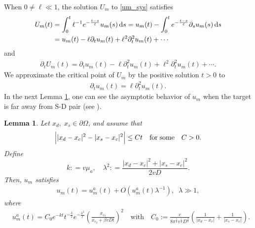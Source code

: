 \documentclass[10pt]{article}
\newtheorem{lemma}[theorem]{Lemma}
\numberwithin{equation}{section}
\numberwithin{figure}{section}
\begin{document}
When $ 0 \neq \ell \ll 1$, the solution $U_m$ to \eqref{um_sys} satisfies 
\begin{equation*}
\begin{split}
U_m(t) &= \int_0^t \ell^{-1}e^{-\frac{t-s}{\ell}} u_m (s)  \,{\rm d}s  = u_m(t) - \int_0^t  e^{-\frac{t-s}{\ell}} \partial_s u_m (s)  \,{\rm d}s  \\
&= u_m(t) - \ell \partial_t u_m (t) + \ell^2 \partial^2_t u_m (t) + \cdots
\end{split}
\end{equation*}
and
\begin{equation*}
\begin{split}
\partial_t U_m(t) = \partial_t u_m(t) - \ell \partial^2_t u_m (t) + \ell^2 \partial^2_t u_m (t) + \cdots.
\end{split}
\end{equation*}
We approximate the critical point of $U_m$ by the positive solution $t>0$ to
\begin{equation}\label{ellsmalleq}
\begin{split}
\partial_t u_m(t) = \ell \partial^2_t u_m (t).
\end{split}
\end{equation}
In the next Lemma \ref{solbehaviortheorem1}, one can see the asymptotic behavior of ${u}_m$ when the target is far away from S-D pair (see \cite[Theorem 2.2 and Remark 2.3]{Chen2023}).
\begin{lemma}\label{solbehaviortheorem1}
Let $x_d, \; x_s\in\partial\Omega$, and assume that
\begin{equation}\label{uma_constr}
\begin{split}
\Big| |x_d-x_c|^2-|x_s-x_c|^2 \Big| \le C t \quad {\rm for\; some} \quad C>0.
\end{split}
\end{equation}
Define
\begin{equation}\label{defk}
k: = v \mu _a , \quad \lambda^2: = \frac{|x_d-x_c|^2+|x_s-x_c|^2}{2vD}.
\end{equation}
Then, $u_m$ satisfies
\begin{equation}\label{1st_asym_um}
\begin{split}
u_m(t) = u^a_m(t) +
O \left( u^a_m(t) \lambda^{-1}  \right),\;\; \lambda \gg 1,
\end{split}
\end{equation}
where
\begin{equation}\label{defIt}
\begin{split}
&u^a_m(t) = C_0 e^{-kt}  t^{-\frac{3}{2}} e^{-\frac{\lambda^2}{t}}
\left(\frac{x_{c_3}}{x_{c_3}+\beta v D t}\right)^2 \quad \mbox{with} \quad C_0 := \frac{c}{8\pi^\frac{5}{2} v^\frac{1}{2} D^\frac{3}{2} } \left( \frac{1}{|x_d-x_c|} + \frac{1}{|x_s-x_c|} \right).
\end{split}
\end{equation}
\end{lemma}
\end{document}
